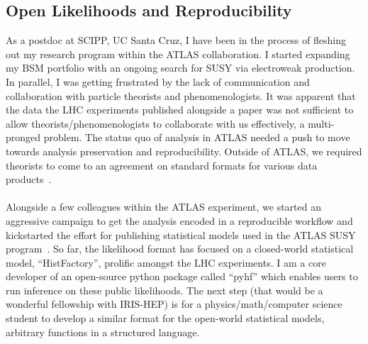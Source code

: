 \documentclass[10pt,a4paper,sans]{moderncv/moderncv} %
\begin{document}
\subsection{Open Likelihoods and Reproducibility}
As a postdoc at SCIPP, UC Santa Cruz, I have been in the process of fleshing out my research program within the ATLAS collaboration. I started expanding my BSM portfolio with an ongoing search for SUSY via electroweak production. In parallel, I was getting frustrated by the lack of communication and collaboration with particle theorists and phenomenologists. It was apparent that the data the LHC experiments published alongside a paper was not sufficient to allow theorists/phenomenologists to collaborate with us effectively, a multi-pronged problem. The status quo of analysis in ATLAS needed a push to move towards analysis preservation and reproducibility. Outside of ATLAS, we required theorists to come to an agreement on standard formats for various data products~\cite{Cranmer:2021urp, Heinrich2021}.
\\
\\
Alongside a few colleagues within the ATLAS experiment, we started an aggressive campaign to get the analysis encoded in a reproducible workflow and kickstarted the effort for publishing statistical models used in the ATLAS SUSY program~\cite{ATL-PHYS-PUB-2019-029}. So far, the likelihood format has focused on a closed-world statistical model, ``HistFactory'', prolific amongst the LHC experiments. I am a core developer of an open-source python package called ``pyhf'' which enables users to run inference on these public likelihoods. The next step (that would be a wonderful fellowship with IRIS-HEP) is for a physics/math/computer science student to develop a similar format for the open-world statistical models, arbitrary functions in a structured language.
\end{document}
